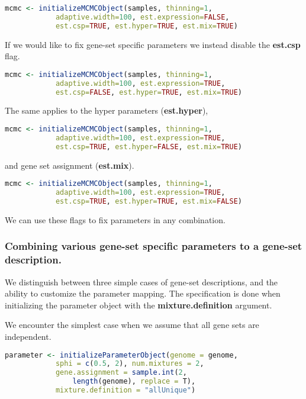 \begin{lstlisting}[language=R]
mcmc <- initializeMCMCObject(samples, thinning=1, 
			adaptive.width=100, est.expression=FALSE, 
			est.csp=TRUE, est.hyper=TRUE, est.mix=TRUE)
\end{lstlisting}

If we would like to fix gene-set specific parameters we instead disable the \textbf{est.csp} flag.

\begin{lstlisting}[language=R]
mcmc <- initializeMCMCObject(samples, thinning=1, 
			adaptive.width=100, est.expression=TRUE, 
			est.csp=FALSE, est.hyper=TRUE, est.mix=TRUE)
\end{lstlisting}

The same applies to the hyper parameters (\textbf{est.hyper}),

\begin{lstlisting}[language=R]
mcmc <- initializeMCMCObject(samples, thinning=1, 
			adaptive.width=100, est.expression=TRUE, 
			est.csp=TRUE, est.hyper=FALSE, est.mix=TRUE)
\end{lstlisting}

and gene set assignment (\textbf{est.mix}).

\begin{lstlisting}[language=R]
mcmc <- initializeMCMCObject(samples, thinning=1, 
			adaptive.width=100, est.expression=TRUE, 
			est.csp=TRUE, est.hyper=TRUE, est.mix=FALSE)
\end{lstlisting}

We can use these flags to fix parameters in any combination.

\subsubsection{Combining various gene-set specific parameters to a gene-set description.}

We distinguish between three simple cases of gene-set descriptions, and the ability to customize the parameter
mapping. The specification is done when initializing the parameter object with the \textbf{mixture.definition}
argument.

We encounter the simplest case when we assume that all gene sets are independent.

\begin{lstlisting}[language=R]
parameter <- initializeParameterObject(genome = genome, 
			sphi = c(0.5, 2), num.mixtures = 2,
			gene.assignment = sample.int(2, 
				length(genome), replace = T),
			mixture.definition = "allUnique")
\end{lstlisting}

